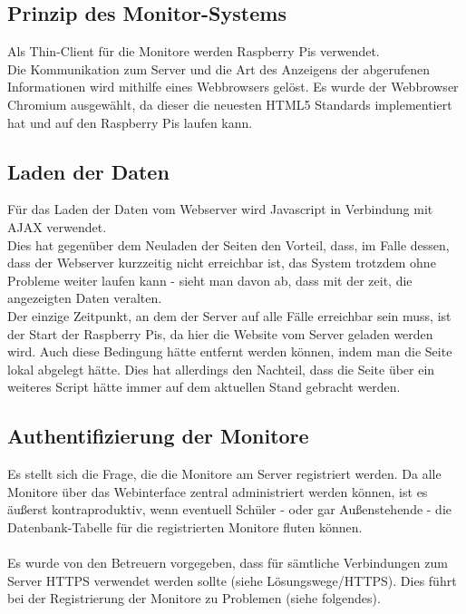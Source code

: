 \subsection{Prinzip des Monitor-Systems}

Als Thin-Client für die Monitore werden Raspberry Pis verwendet.\\
Die Kommunikation zum Server und die Art des Anzeigens der abgerufenen Informationen wird mithilfe eines Webbrowsers gelöst. Es wurde der Webbrowser Chromium ausgewählt, da dieser die neuesten HTML5 Standards implementiert hat und auf den Raspberry Pis laufen kann.

\subsection{Laden der Daten}

Für das Laden der Daten vom Webserver wird Javascript in Verbindung mit AJAX verwendet.\\
Dies hat gegenüber dem Neuladen der Seiten den Vorteil, dass, im Falle dessen, dass der Webserver kurzzeitig nicht erreichbar ist, das System trotzdem ohne Probleme weiter laufen kann - sieht man davon ab, dass mit der zeit, die angezeigten Daten veralten.\\
Der einzige Zeitpunkt, an dem der Server auf alle Fälle erreichbar sein muss, ist der Start der Raspberry Pis, da hier die Website vom Server geladen werden wird. Auch diese Bedingung hätte entfernt werden können, indem man die Seite lokal abgelegt hätte. Dies hat allerdings den Nachteil, dass die Seite über ein weiteres Script hätte immer auf dem aktuellen Stand gebracht werden.

\subsection{Authentifizierung der Monitore}

Es stellt sich die Frage, die die Monitore am Server registriert werden. Da alle Monitore über das Webinterface zentral administriert werden können, ist es äußerst kontraproduktiv, wenn eventuell Schüler - oder gar Außenstehende - die Datenbank-Tabelle für die registrierten Monitore fluten können.\\
\\
Es wurde von den Betreuern vorgegeben, dass für sämtliche Verbindungen zum Server HTTPS verwendet werden sollte (siehe Lösungswege/HTTPS). Dies führt bei der Registrierung der Monitore zu Problemen (siehe folgendes).

